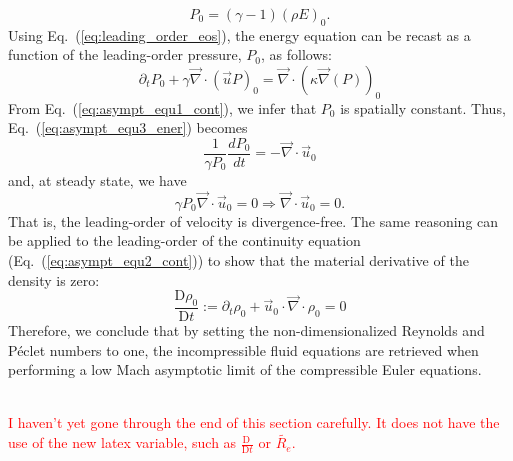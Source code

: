 \documentclass[preprint,10pt]{elsarticle}
\renewcommand{\div}{\vec{\nabla}\! \cdot \!}
\newcommand{\grad}{\vec{\nabla}}
\newcommand{\resi}{R_e}
\newcommand{\resinew}{\widetilde{\resi}}
\newcommand{\matder}[1]{\frac{\textrm{D} #1}{\textrm{D} t}}
\newcommand{\eqt}[1]{Eq.~(\ref{#1})}                     %
\newcommand{\tcr}[1]{\textcolor{red}{#1}}
\begin{document}
\begin{equation}
\label{eq:leading_order_eos}
 P_0 = (\gamma - 1) (\rho E)_0 .
\end{equation}
%
Using \eqt{eq:leading_order_eos}, the energy equation can be recast as a function of the leading-order pressure, $P_0$, as follows:
%
\begin{equation}\label{eq:asympt_equ3_ener}
 \partial_t P_0 + \gamma \div \left( \vec{u} P \right)_0 =  \div(\kappa \grad(P))_0
\end{equation}
%
From \eqt{eq:asympt_equ1_cont}, we infer that $P_0$ is spatially constant. Thus, \eqt{eq:asympt_equ3_ener} becomes
%
\begin{equation}
\frac{1}{\gamma P_0} \frac{d P_0}{dt} = - \div \vec{u}_0 
\end{equation}
%
and, at steady state, we have
%
\begin{equation}
\gamma P_0 \div  \vec{u}_0 = 0 \Rightarrow \div  \vec{u}_0 = 0.
\end{equation}
%
That is, the leading-order of velocity is divergence-free. The same reasoning can be applied to the leading-order of the continuity equation (\eqt{eq:asympt_equ2_cont}) to show that the material derivative of the density is zero:
\begin{equation}
\matder{\rho_0} := \partial_t \rho_0 + \vec{u}_0 \cdot \div \rho_0 = 0
\end{equation}
%
Therefore, we conclude that by setting the non-dimensionalized Reynolds and P\'eclet numbers to one, the incompressible fluid equations are retrieved when performing a low Mach asymptotic limit of the compressible Euler equations.

\tcr{\\ I haven't yet gone through the end of this section carefully. It does not have the use of the new latex variable, such as $\matder{\ }$ or $\resinew$.\\}
\end{document}
